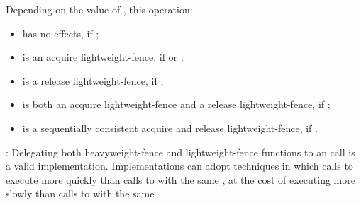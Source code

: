 \begin{itemdescr}


\pnum
\effects
Depending on the value of , this operation:
\begin{itemize}
    \item  has no effects, if ;
\item  is an acquire lightweight-fence, if  or ;
\item is a release lightweight-fence, if ;
\item is both an acquire lightweight-fence and a release lightweight-fence, if ;
\item is a sequentially consistent acquire and release lightweight-fence, if .
\end{itemize}

\end{itemdescr}



\begin{note} : Delegating both heavyweight-fence and lightweight-fence functions to an
 call is a valid implementation. Implementations can adopt
techniques in which calls to  execute more quickly than calls
to  with the same , at the cost of
 executing more slowly than calls to
 with the same 
\end{note}  


